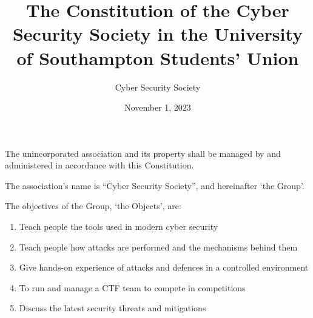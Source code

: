 \documentclass[12pt]{constitution}
\begin{document}

\title{The Constitution of the Cyber Security Society in the University of Southampton Students' Union}
\author{Cyber Security Society}
\date{November 1, 2023}
\maketitle


\label{clause:adoption-constitution}

The unincorporated association and its property shall be managed by and administered in accordance with this Constitution.


\label{clause:name}

The association's name is ``Cyber Security Society'', and hereinafter `the Group'.


\label{clause:objects}

The objectives of the Group, `the Objects', are:

\begin{enumerate}
    \item Teach people the tools used in modern cyber security
    \item Teach people how attacks are performed and the mechanisms behind them
    \item Give hands-on experience of attacks and defences in a controlled environment
    \item To run and manage a CTF team to compete in competitions
    \item Discuss the latest security threats and mitigations
\end{enumerate}


\label{clause:membership}
\end{document}

